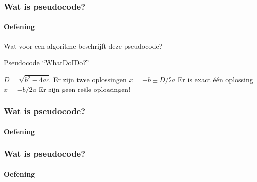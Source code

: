 \begin{frame}
\frametitle{Wat is pseudocode?}
\framesubtitle{Oefening}

Wat voor een algoritme beschrijft deze pseudocode?

\begin{algorithm}[H]
\caption{Pseudocode ``WhatDoIDo?''}
\begin{algorithmic}[1]
	\State $D=\sqrt{b^2-4ac}$
		\State Er zijn twee oplossingen
		\State $x = -b\pm D / 2a$
		\State Er is exact \'e\'en oplossing
		\State $x = -b / 2a$
	\Else {}
		\State Er zijn geen re\"ele oplossingen!
	\EndIf
\EndFunction
\end{algorithmic}
\end{algorithm}

\end{frame}




\begin{frame}
\frametitle{Wat is pseudocode?}
\framesubtitle{Oefening}



\end{frame}




\begin{frame}
\frametitle{Wat is pseudocode?}
\framesubtitle{Oefening}



\end{frame}




